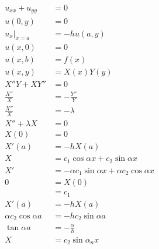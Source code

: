 \documentclass{article}
\begin{document}
\begin{align*}
  u_{x x} + u_{y y}        & = 0                                                        \\
  u(0, y)                  & = 0                                                        \\
  u_x|_{x = a}             & = -h u(a, y)                                               \\
  u(x, 0)                  & = 0                                                        \\
  u(x, b)                  & = f(x)                                                     \\
  u(x, y)                  & = X(x) Y(y)                                                \\
  X'' Y + X Y''            & = 0                                                        \\
  \frac{X''}{X}            & = -\frac{Y''}{Y}                                           \\
  \frac{X''}{X}            & = -\lambda                                                 \\
  X'' + \lambda X          & = 0                                                        \\
  X(0)                     & = 0                                                        \\
  X'(a)                    & = -h X(a)                                                  \\
  X                        & = c_1 \cos \alpha x + c_2 \sin \alpha x                    \\
  X'                       & = -\alpha c_1 \sin \alpha x + \alpha c_2 \cos \alpha x     \\
  0                        & = X(0)                                                     \\
                           & = c_1                                                      \\
  X'(a)                    & = -h X(a)                                                  \\
  \alpha c_2 \cos \alpha a & = -h c_2 \sin \alpha a                                     \\
  \tan \alpha a            & = -\frac{\alpha}{h}                                        \\
  X                        & = c_2 \sin \alpha_n x                                      \\

\end{align*}
\end{document}
